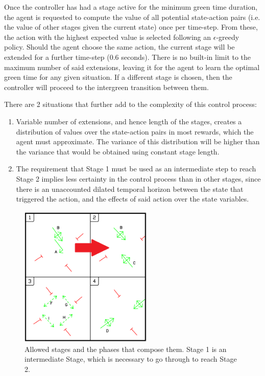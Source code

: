 \documentclass[sigconf,anonymous]{aamas}
\begin{document}
Once the controller has had a stage active for the minimum green time duration, the agent is requested to compute the value of all potential state-action pairs (i.e. the value of other stages given the current state) once per time-step.
From these, the action with the highest expected value is selected following an $\epsilon$-greedy policy\cite{suttonbarto}.
Should the agent choose the same action, the current stage will be extended for a further time-step (0.6 seconds).
There is no built-in limit to the maximum number of said extensions, leaving it for the agent to learn the optimal green time for any given situation.
If a different stage is chosen, then the controller will proceed to the intergreen transition between them.

There are 2 situations that further add to the complexity of this control process:
\begin{enumerate}
\item Variable number of extensions, and hence length of the stages, creates a distribution of values over the state-action pairs in most rewards, which the agent must approximate. The variance of this distribution will be higher than the variance that would be obtained using constant stage length.
\item The requirement that Stage 1 must be used as an intermediate step to reach Stage 2 implies less certainty in the control process than in other stages, since there is an unaccounted dilated temporal horizon between the state that triggered the action, and the effects of said action over the state variables.
\end{enumerate}

\begin{figure}                                                
\centering                                                    
\includegraphics[width=2.5in]{phases_limited.png}                                    
\caption{Allowed stages and the phases that compose them. Stage 1 is an intermediate Stage, which is necessary to go through to reach Stage 2.}                                  
\label{intersection}                                               
\end{figure}     
\end{document}
